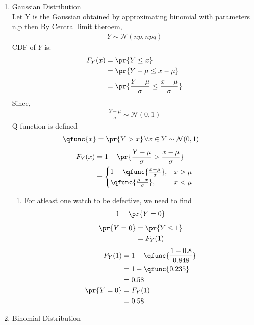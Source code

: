 \documentclass[journal,12pt,onecolumn]{IEEEtran}
\begin{document}
\begin{enumerate}[label=(\roman*)]
\item Gaussian Distribution\\
Let Y is the Gaussian obtained by approximating binomial with parameters n,p then By Central limit theroem, 
\begin{align}
	Y \sim \mathcal{N}(np,npq)
\end{align}
CDF of $Y$ is:
\begin{align}
	F_Y(x)&=\pr{Y \le x} \\
	&=\pr{Y-\mu \le x-\mu} \\
	&=\pr{\frac{Y-\mu}{\sigma} \le \frac{x-\mu}{\sigma}} 
\end{align}
Since, 
\begin{align}
	\frac{Y-\mu}{\sigma} \sim \mathcal{N}(0,1)
\end{align}
Q function is defined
\begin{align}
	\qfunc{x} &= \pr{Y > x} \, \forall x \in Y \sim \mathcal{N}(0,1) 
\end{align}
\begin{align}
	F_Y(x)&=1-\pr{\frac{Y-\mu}{\sigma} > \frac{x-\mu}{\sigma}}\\
	&= 
    \begin{cases}
        1-\qfunc{ \frac{x-\mu}{\sigma}}, &  x > \mu \\
        \qfunc{ \frac{\mu-x}{\sigma}} , &  x < \mu
    \end{cases} 
\end{align}
\begin{enumerate}[label=(\alph*)]
\item For atleast one watch to be defective, we need to find
\begin{align}
        1 - \pr{Y=0}
\end{align}
\begin{align}
	\pr{Y = 0} &= \pr{Y \le 1} \\
		   &= F_Y(1) 
\end{align}
\begin{align}
	F_Y(1)&=1 -\qfunc{ \frac{1-0.8}{0.848}} \\
	&= 1 - \qfunc{0.235}\\
	&= 0.58\\
	\pr{Y = 0} &= F_Y(1)\\
		   &= 0.58
\end{align}
\end{enumerate}
\item Binomial Distribution\\

\end{enumerate}
\end{document}
